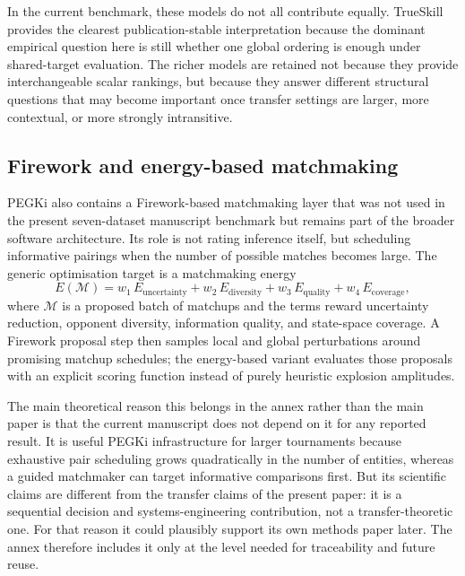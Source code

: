 \documentclass[twoside,twocolumn,9pt]{article}
\begin{document}
In the current benchmark, these models do not all contribute equally. TrueSkill provides the clearest publication-stable interpretation because the dominant empirical question here is still whether one global ordering is enough under shared-target evaluation. The richer models are retained not because they provide interchangeable scalar rankings, but because they answer different structural questions that may become important once transfer settings are larger, more contextual, or more strongly intransitive.

\subsection{Firework and energy-based matchmaking}

PEGKi also contains a Firework-based matchmaking layer that was not used in the present seven-dataset manuscript benchmark but remains part of the broader software architecture. Its role is not rating inference itself, but scheduling informative pairings when the number of possible matches becomes large. The generic optimisation target is a matchmaking energy
\[
E(\mathcal{M})=
w_1\,E_{\mathrm{uncertainty}}
+w_2\,E_{\mathrm{diversity}}
+w_3\,E_{\mathrm{quality}}
+w_4\,E_{\mathrm{coverage}},
\]
where $\mathcal{M}$ is a proposed batch of matchups and the terms reward uncertainty reduction, opponent diversity, information quality, and state-space coverage. A Firework proposal step then samples local and global perturbations around promising matchup schedules; the energy-based variant evaluates those proposals with an explicit scoring function instead of purely heuristic explosion amplitudes.

The main theoretical reason this belongs in the annex rather than the main paper is that the current manuscript does not depend on it for any reported result. It is useful PEGKi infrastructure for larger tournaments because exhaustive pair scheduling grows quadratically in the number of entities, whereas a guided matchmaker can target informative comparisons first. But its scientific claims are different from the transfer claims of the present paper: it is a sequential decision and systems-engineering contribution, not a transfer-theoretic one. For that reason it could plausibly support its own methods paper later. The annex therefore includes it only at the level needed for traceability and future reuse.
\end{document}
